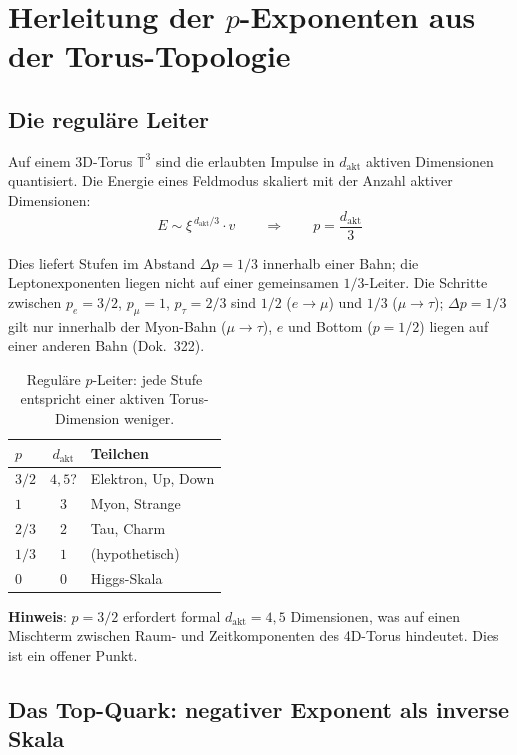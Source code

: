 \section{Herleitung der \texorpdfstring{$p$}{p}-Exponenten aus der Torus-Topologie}

\subsection{Die reguläre Leiter}

Auf einem 3D-Torus $\mathbb{T}^3$ sind die erlaubten Impulse in
$d_{\text{akt}}$ aktiven Dimensionen quantisiert. Die Energie eines
Feldmodus skaliert mit der Anzahl aktiver Dimensionen:
\begin{equation}
    E \sim \xi^{\,d_{\text{akt}}/3} \cdot v
    \qquad \Rightarrow \qquad
    p = \frac{d_{\text{akt}}}{3}
\end{equation}

Dies liefert Stufen im Abstand $\Delta p = 1/3$ innerhalb einer Bahn; die
Leptonexponenten liegen nicht auf einer gemeinsamen $1/3$-Leiter. Die
Schritte zwischen $p_e = 3/2$, $p_\mu = 1$, $p_\tau = 2/3$ sind $1/2$
($e\to\mu$) und $1/3$ ($\mu\to\tau$); $\Delta p = 1/3$ gilt nur innerhalb der
Myon-Bahn ($\mu \to \tau$), $e$ und Bottom ($p = 1/2$) liegen auf einer
anderen Bahn (Dok.~322).

\begin{table}[htbp]
\centering
\begin{tabular}{lcl}
\toprule
$p$ & $d_{\text{akt}}$ & \textbf{Teilchen} \\
\midrule
$3/2$ & $4{,}5$? & Elektron, Up, Down \\
$1$   & $3$     & Myon, Strange \\
$2/3$ & $2$     & Tau, Charm \\
$1/3$ & $1$     & (hypothetisch) \\
$0$   & $0$     & Higgs-Skala \\
\bottomrule
\end{tabular}
\caption{Reguläre $p$-Leiter: jede Stufe entspricht einer aktiven
Torus-Dimension weniger.}
\label{tab:p_leiter}
\end{table}

\textbf{Hinweis}: $p = 3/2$ erfordert formal $d_{\text{akt}} = 4{,}5$
Dimensionen, was auf einen Mischterm zwischen Raum- und
Zeitkomponenten des 4D-Torus hindeutet. Dies ist ein offener Punkt.

\subsection{Das Top-Quark: negativer Exponent als inverse Skala}


